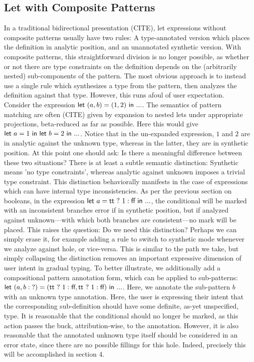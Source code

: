 \subsection{Let with Composite Patterns}
\label{sec:calculus-let}


In a traditional bidirectional presentation (CITE), let expressions without composite patterns usually have two rules: A type-annotated version which places the definition in analytic position, and an unannotated synthetic version. With composite patterns, this straightforward division is no longer possible, as whether or not there are type constraints on the definition depends on the (arbitrarily nested) sub-components of the pattern.
The most obvious approach is to instead use a single rule which synthesizes a type from the pattern, then analyzes the definition against that type. However, this runs afoul of user expectation. Consider the expression $\textsf{let}~ (a,b) = (1,2) ~\textsf{in}~ ...$. The semantics of pattern matching are often (CITE) given by expansion to nested lets under appropriate projections, beta-reduced as far as possible. Here this would give $\textsf{let}~ a = 1 ~\textsf{in}~ \textsf{let}~ b = 2 ~\textsf{in}~ ...$. Notice that in the un-expanded expression, $1$ and $2$ are in analytic against the unknown type, whereas in the latter, they are in synthetic position.
At this point one should ask: Is there a meaningful difference between these two situations? There is at least a subtle semantic distinction: Synthetic means 'no type constraints', whereas analytic against unknown imposes a trivial type constraint.
This distinction behaviorally manifests in the case of expressions which can have internal type inconsistencies. As per the previous section on booleans, in the expression $\textsf{let}~ a = {\normalfont\textsf{tt}} ~?~ 1 : {\normalfont\textsf{ff}} ~\textsf{in}~ ...$, the conditional will be marked with an inconsistent branches error if in synthetic position, but if analyzed against unknown---with which both branches are consistent---no mark will be placed.
This raises the question: Do we need this distinction? Perhaps we can simply erase it, for example adding a rule to switch to synthetic mode whenever we analyze against hole, or vice-versa. This is similar to the path we take, but simply collapsing the distinction removes an important expressive dimension of user intent in gradual typing.
To better illustrate, we additionally add a compositional pattern annotation form, which can be applied to sub-patterns: $\textsf{let}~ (a, b:\operatorname{?}) = ({\normalfont\textsf{tt}} ~?~ 1 : {\normalfont\textsf{ff}},{\normalfont\textsf{tt}} ~?~ 1 : {\normalfont\textsf{ff}}) ~\textsf{in}~ ...$. Here, we annotate the sub-pattern $b$ with an unknown type annotation. Here, the user is expressing their intent that the corresponding sub-definition should have some definite, as-yet unspecified, type. It is reasonable that the conditional should no longer be marked, as this action passes the buck, attribution-wise, to the annotation. However, it is also reasonable that the annotated unknown type itself should be considered in an error state, since there are no possible fillings for this hole. Indeed, precisely this will be accomplished in section 4.



